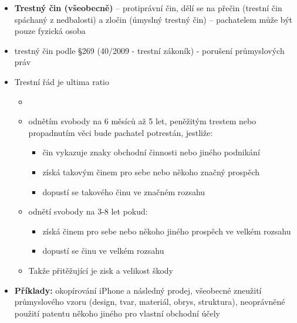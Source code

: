\begin{itemize}
    \item \textbf{Trestný čin (všeobecně)} – protiprávní čin, dělí se na přečin (trestní čin spáchaný
    z nedbalosti) a zločin (úmyslný trestný čin) – pachatelem může být pouze fyzická
    osoba
    \item trestný čin podle §269 (40/2009 - trestní zákoník) - porušení průmyslových
    práv
    \item Trestní řád je ultima ratio
    \begin{itemize}
        \item {}
        \item odnětím svobody na 6 měsíců až 5 let, peněžitým trestem nebo
        propadnutím věci bude pachatel potrestán, jestliže:
        \begin{itemize}
            \item čin vykazuje znaky obchodní činnosti nebo jiného podnikání
            \item získá takovým činem pro sebe nebo někoho značný prospěch
            \item dopustí se takového činu ve značném rozsahu
        \end{itemize}
        \item odnětí svobody na 3-8 let pokud:
        \begin{itemize}
            \item získá činem pro sebe nebo někoho jiného prospěch ve velkém
            rozsahu
            \item dopustí se činu ve velkém rozsahu
        \end{itemize}
        \item Takže přitěžující je zisk a velikost škody
    \end{itemize}
    \item \textbf{Příklady:} okopírování iPhone a následný prodej, všeobecné zneužití
    průmyslového vzoru (design, tvar, materiál, obrys, struktura), neoprávněné použití
    patentu někoho jiného pro vlastní obchodní účely
\end{itemize}



